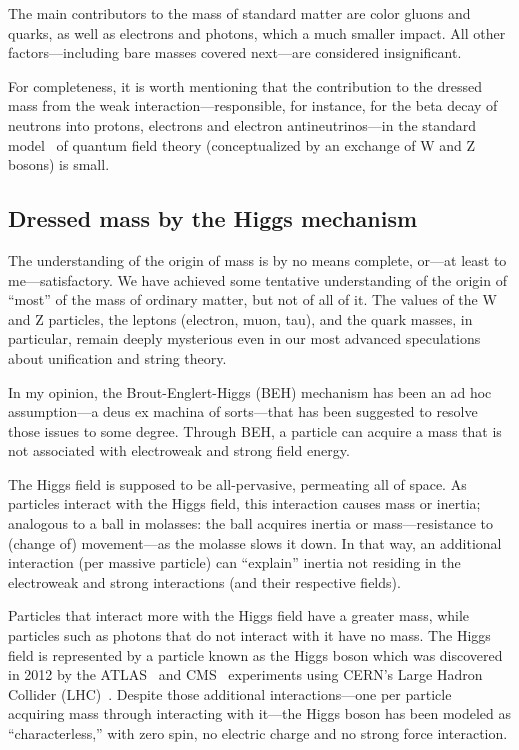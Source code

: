 The main contributors to the mass of standard matter are color gluons and quarks, as well as electrons and photons, which  a much smaller impact.
All other factors---including bare masses covered next---are considered insignificant.

For completeness, it is worth mentioning that the contribution to the dressed mass from the weak interaction---responsible, for instance,
for the beta decay of neutrons into protons, electrons and electron antineutrinos---in the standard model~\cite{cottingham_greenwood_2007}
of quantum field theory (conceptualized by an exchange of W and Z bosons) is small.

\subsection{Dressed mass by the Higgs mechanism}

The understanding of the origin of mass is by no means complete, or---at least to me---satisfactory.
We have achieved some tentative understanding
of the origin of ``most'' of the mass of ordinary matter, but not of all of it. The values
of the   W and Z particles, the leptons (electron, muon, tau), and the quark masses, in particular, remain deeply mysterious even in our most advanced
speculations about unification and string theory.

In my opinion, the Brout-Englert-Higgs (BEH) mechanism has been an ad hoc assumption---a deus ex machina of sorts---that has been suggested to resolve those issues to some degree.
Through BEH, a particle can acquire a mass that is not associated with electroweak and strong field energy.

The Higgs field is supposed to be all-pervasive, permeating all of space.
As particles interact with the Higgs field, this interaction causes mass or inertia;
analogous to a ball in molasses:
the ball acquires inertia or  mass---resistance to (change of) movement---as the molasse slows it down.
In that way, an additional interaction (per massive particle)
can ``explain'' inertia not residing in the electroweak and strong interactions (and
their respective fields).

Particles that interact more with the Higgs field have a greater mass,
while particles such as photons that do not interact with it have no mass.
The Higgs field is represented by a particle known as the Higgs boson
which was discovered in 2012 by the ATLAS~\cite{ATLASLHCHIGGS2012} and CMS~\cite{CMSLHCHIGGS2012}
experiments using CERN's Large Hadron Collider (LHC)~\cite{ATLAS_Higgs-2022,CMS_Higgs-2022,ATLAS-CERN}.
Despite those additional interactions---one per particle acquiring mass through interacting with it---the Higgs boson
has been modeled as ``characterless,'' with zero spin, no electric charge and no strong force interaction.





